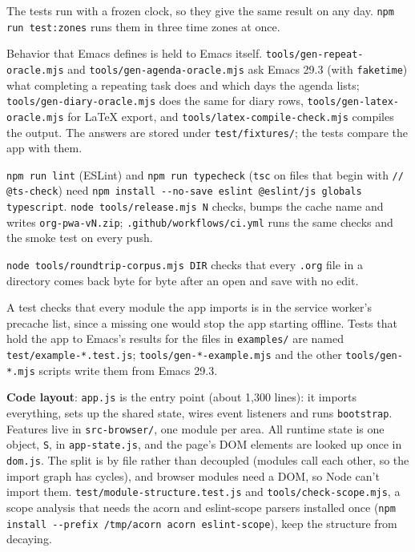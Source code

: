\documentclass[11pt]{article}
\begin{document}
The tests run with a frozen clock, so they give the same result on any day. \texttt{npm run test:zones} runs them in three time zones at once.

Behavior that Emacs defines is held to Emacs itself. \texttt{tools/gen-repeat-oracle.mjs} and \texttt{tools/gen-agenda-oracle.mjs} ask Emacs 29.3 (with \texttt{faketime}) what completing a repeating task does and which days the agenda lists; \texttt{tools/gen-diary-oracle.mjs} does the same for diary rows, \texttt{tools/gen-latex-oracle.mjs} for \LaTeX{} export, and \texttt{tools/latex-compile-check.mjs} compiles the output. The answers are stored under \texttt{test/fixtures/}; the tests compare the app with them.

\texttt{npm run lint} (ESLint) and \texttt{npm run typecheck} (\texttt{tsc} on files that begin with \texttt{// @ts-check}) need \texttt{npm install -{}-{}no-save eslint @eslint/js globals typescript}. \texttt{node tools/release.mjs N} checks, bumps the cache name and writes \texttt{org-pwa-vN.zip}; \texttt{.github/workflows/ci.yml} runs the same checks and the smoke test on every push.

\texttt{node tools/roundtrip-corpus.mjs DIR} checks that every \texttt{.org} file in a directory comes back byte for byte after an open and save with no edit.

A test checks that every module the app imports is in the service worker's precache list, since a missing one would stop the app starting offline. Tests that hold the app to Emacs's results for the files in \texttt{examples/} are named \texttt{test/example-*.test.js}; \texttt{tools/gen-*-example.mjs} and the other \texttt{tools/gen-*.mjs} scripts write them from Emacs 29.3.

\textbf{Code layout}: \texttt{app.js} is the entry point (about 1,300 lines): it imports everything, sets up the shared state, wires event listeners and runs \texttt{bootstrap}. Features live in \texttt{src-browser/}, one module per area. All runtime state is one object, \texttt{S}, in \texttt{app-state.js}, and the page's DOM elements are looked up once in \texttt{dom.js}. The split is by file rather than decoupled (modules call each other, so the import graph has cycles), and browser modules need a DOM, so Node can't import them. \texttt{test/module-structure.test.js} and \texttt{tools/check-scope.mjs}, a scope analysis that needs the acorn and eslint-scope parsers installed once (\texttt{npm install -{}-{}prefix /tmp/acorn acorn eslint-scope}), keep the structure from decaying.
\end{document}
